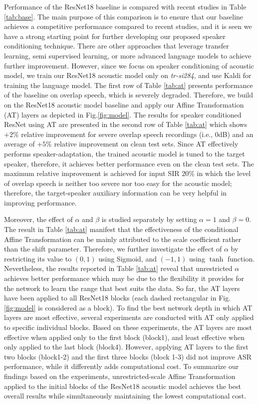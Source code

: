 \documentclass{article}
\begin{document}
Performance of the ResNet18 baseline is compared with recent studies in Table \ref{tab:base}. The main purpose of this comparison is to ensure that our baseline achieves a competitive performance compared to recent studies, and it is seen we have a strong starting point for further developing our proposed speaker conditioning technique.  There are other approaches that leverage transfer learning, semi supervised learning, or more advanced language models to achieve further improvement. However, since we focus on speaker conditioning of acoustic model, we train our ResNet18 acoustic model only on \textit{tr-si284}, and use Kaldi for training the language model. The first row of Table \ref{tab:at} presents performance of the baseline on overlap speech, which is severely degraded. Therefore, we build on the ResNet18 acoustic model baseline and apply our Affine Transformation (AT) layers as depicted in Fig.\ref{fig:model}. The results for speaker conditioned ResNet using AT are presented in the second row of Table \ref{tab:at} which shows $+2\%$ relative improvement for severe overlap speech recordings (i.e., $0$dB) and an average of $+5\%$ relative improvement on clean test sets. Since AT effectively performs speaker-adaptation, the trained acoustic model is tuned to the target speaker, therefore, it achieves better performance even on the clean test sets. The maximum relative improvement is achieved for input SIR $20\%$ in which the level of overlap speech is neither too severe nor too easy for the acoustic model; therefore, the  target-speaker auxiliary information can be very helpful in improving performance.  

Moreover, the effect of $\alpha$ and $\beta$ is studied separately by setting $\alpha=1$ and $\beta=0$. The result in Table \ref{tab:at} manifest that the effectiveness of the conditional Affine Transformation can be mainly attributed to the scale coefficient rather than the shift parameter. Therefore, we further investigate the effect of  $\alpha$ by restricting its value to $(0,1)$ using Sigmoid, and $(-1,1)$ using $\tanh$ function. Nevertheless, the results reported in Table \ref{tab:at} reveal that unrestricted $\alpha$ achieves better performance which may be due to the flexibility it provides for the network to learn the range that best suits the data. So far, the AT layers have been applied to all ResNet18 blocks (each dashed rectangular in Fig. \ref{fig:model} is considered as a block). To find the best network depth in which AT layers are most effective, several experiments are conducted with AT only applied to specific individual blocks. Based on these experiments, the AT layers are most effective when applied only to the first block (block1), and least effective when only applied to the last block (block4). However, applying  AT layers to the first two blocks (block1-2) and the first three blocks (block 1-3) did not improve ASR performance, while it differently adds computational cost. To summarize our findings based on the experiments, unrestricted-scale Affine Transformation applied to the initial blocks of the ResNet18 acoustic model achieves the best overall results while simultaneously maintaining the lowest computational cost. 
\end{document}
